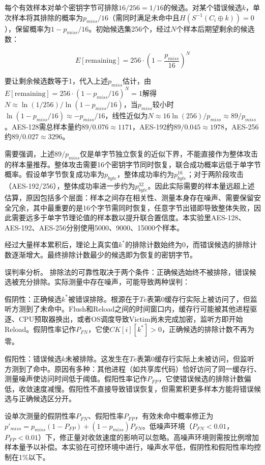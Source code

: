 每个有效样本对单个密钥字节可排除$16/256 = 1/16$的候选。对某个错误候选$k$，单次样本将其排除的概率为$p_{miss}/16$（需同时满足未命中且$H(S^{-1}(C_i \oplus k)) = 0$），保留概率为$1 - p_{miss}/16$。初始候选集256个，经过$N$个样本后期望剩余的候选数：

\begin{equation}
E[\text{remaining}] = 256 \cdot \left(1 - \frac{p_{miss}}{16}\right)^{N}
\end{equation}

要让剩余候选数等于1，代入上述$p_{miss}$估计，由$E[\text{remaining}] = 256 \cdot (1 - p_{miss}/16)^N = 1$解得$N \approx \ln(1/256) / \ln(1 - p_{miss}/16)$，当$p_{miss}$较小时$\ln(1 - p_{miss}/16) \approx -p_{miss}/16$，线性近似为$N \approx 16\ln(256) / p_{miss} \approx 89 / p_{miss}$。AES-128需总样本量约$89 / 0.076 \approx 1171$，AES-192约$89 / 0.045 \approx 1978$，AES-256约$89 / 0.027 \approx 3296$。

需要强调，上述$89/p_{miss}$仅是单字节独立恢复的近似下界，不能直接作为整体攻击的样本量推荐。整体攻击需要16个密钥字节同时恢复，联合成功概率远低于单字节概率。假设单字节恢复成功率为$p_{byte}$，整体成功率约为$p_{byte}^{16}$；对于两阶段攻击（AES-192/256），整体成功率进一步约为$p_{byte}^{32}$。因此实际需要的样本量远超上述估算，原因包括多个层面：样本之间存在相关性、测量本身存在噪声、需要保留安全冗余，其中最重要的是16个字节需同时恢复，任意字节出错即导致整体失败，因此需要远多于单字节理论值的样本数以提升联合置信度。本实验里AES-128、AES-192、AES-256分别使用5000、9000、15000个样本。

经过大量样本累积后，理论上真实值$k^*$的排除计数始终为0，而错误候选的排除计数逐渐增大。最终排除计数最少的候选即为恢复的密钥字节。

误判率分析。
排除法的可靠性取决于两个条件：正确候选始终不被排除，错误候选被充分排除。实际测量中存在噪声，可能导致两种误判：

假阴性：正确候选$k^*$被错误排除。根源在于$Te$表第0缓存行实际上被访问了，但监听方测到了未命中。Flush和Reload之间的时间窗口内，缓存行可能被其他进程驱逐、CPU预取器换出，或者OS调度导致Victim尚未完成加密，监听方即开始Reload。假阴性率记作$P_{FN}$，它使$CK[i][k^*] > 0$，正确候选的排除计数不再为零。

假阳性：错误候选$k$未被排除。这发生在$Te$表第0缓存行实际上未被访问，但监听方测到了命中。原因有多种：其他进程（如共享库代码）恰好访问了同一缓存行、测量噪声使访问时间低于阈值。假阳性率记作$P_{FP}$，它使错误候选的排除计数偏低，收敛速度减慢。假阳性不直接导致错误恢复，但需累积更多样本方能将错误候选与正确候选区分开。

设单次测量的假阴性率$P_{FN}$、假阳性率$P_{FP}$，有效未命中概率修正为$p'_{miss} = p_{miss}(1 - P_{FP}) + (1 - p_{miss})P_{FN}$。低噪声环境（$P_{FN} < 0.01$，$P_{FP} < 0.01$）下，修正量对收敛速度的影响可以忽略。高噪声环境则需按比例增加样本量予以补偿。本实验在可控环境中进行，噪声水平低，假阴性和假阳性率均控制在1\%以下。

